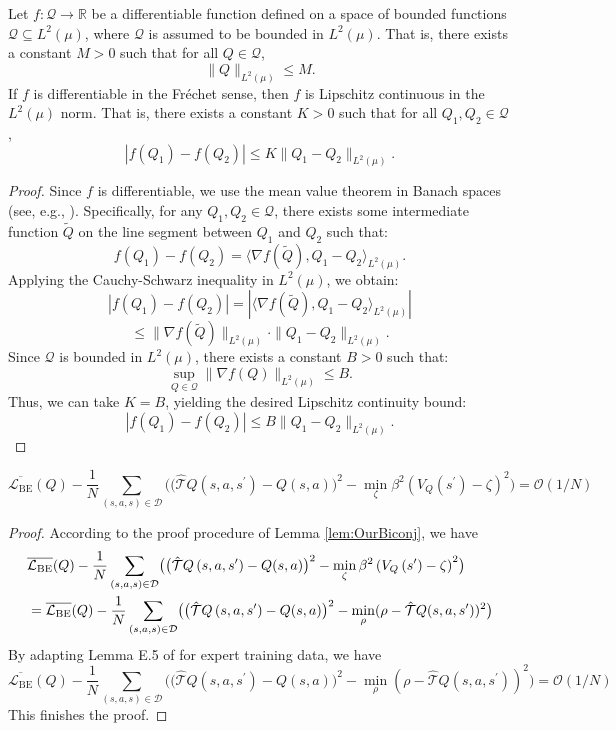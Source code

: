 \begin{lem}
\label{lem:JointLipschitz}
  Let $f: \mathcal{Q} \to \mathbb{R}$ be a differentiable function defined on a space of bounded functions $\mathcal{Q} \subseteq L^2(\mu)$, where $\mathcal{Q}$ is assumed to be bounded in $L^2(\mu)$. That is, there exists a constant $M > 0$ such that for all $Q \in \mathcal{Q}$,
$$
\| Q \|_{L^2(\mu)} \leq M.
$$
If $f$ is differentiable in the Fréchet sense, then $f$ is Lipschitz continuous in the $L^2(\mu)$ norm. That is, there exists a constant $K > 0$ such that for all $Q_1, Q_2 \in \mathcal{Q}$,
$$
|f(Q_1) - f(Q_2)| \leq K \|Q_1 - Q_2\|_{L^2(\mu)}.
$$
\end{lem}

\begin{proof}
    Since $f$ is differentiable, we use the mean value theorem in Banach spaces (see, e.g., \citet{yosida2012functional}). Specifically, for any $Q_1, Q_2 \in \mathcal{Q}$, there exists some intermediate function $\tilde{Q}$ on the line segment between $Q_1$ and $Q_2$ such that:
$$
f(Q_1) - f(Q_2) = \langle \nabla f(\tilde{Q}), Q_1 - Q_2 \rangle_{L^2(\mu)}.
$$
Applying the Cauchy-Schwarz inequality in $L^2(\mu)$, we obtain:
$$
|f(Q_1) - f(Q_2)| = |\langle 
\nabla f(\tilde{Q}), Q_1 - Q_2 \rangle_{L^2(\mu)}|
$$
$$
\leq \|\nabla f(\tilde{Q})\|_{L^2(\mu)} \cdot \|Q_1 - Q_2\|_{L^2(\mu)}.
$$
Since $\mathcal{Q}$ is bounded in $L^2(\mu)$, there exists a constant $B > 0$ such that:
$$
\sup_{Q \in \mathcal{Q}} \|\nabla f(Q)\|_{L^2(\mu)} \leq B.
$$
Thus, we can take $K = B$, yielding the desired Lipschitz continuity bound:
$$
|f(Q_1) - f(Q_2)| \leq B \|Q_1 - Q_2\|_{L^2(\mu)}.
$$
\end{proof}

\iffalse


\begin{lem}
$$
\overline{\mathcal{L}_{\mathrm{BE}}}(Q)-\frac{1}{N}\sum_{(s,a,s)\in \mathcal{D}} \bigl(\bigl(\hat{\mathcal{T}} Q\left(s, a, s^{\prime}\right)-Q(s, a)\bigr)^2 -\min_\zeta\beta^2  \left(V_{Q}\left(s^{\prime}\right)-\zeta\right)^2\bigr)=\mathcal{O}(1/N) $$
\end{lem}
\begin{proof}
According to the proof procedure of Lemma \ref{lem:OurBiconj}, we have
    \begin{align}
    &\overline{\mathcal{L}_{\mathrm{BE}}}(Q)-\frac{1}{N}\sum_{(s,a,s)\in \mathcal{D}} \bigl(\bigl(\hat{\mathcal{T}} Q\left(s, a, s^{\prime}\right)-Q(s, a)\bigr)^2 -\min_\zeta\beta^2  \left(V_{Q}\left(s^{\prime}\right)-\zeta\right)^2\bigr)\notag
    \\
    &=\overline{\mathcal{L}_{\mathrm{BE}}}(Q)-\frac{1}{N}\sum_{(s,a,s)\in \mathcal{D}} \bigl(\bigl(\hat{\mathcal{T}} Q\left(s, a, s^{\prime}\right)-Q(s, a)\bigr)^2 -\min_\rho
    (\rho - \hat{\mathcal{T}}Q(s, a, s^\prime))^2\bigr)\notag
    \end{align}
    By adapting Lemma E.5 of \citet{touati2020sharp} for expert training data, we have $$\overline{\mathcal{L}_{\mathrm{BE}}}(Q)-\frac{1}{N}\sum_{(s,a,s)\in \mathcal{D}} \bigl(\bigl(\hat{\mathcal{T}} Q\left(s, a, s^{\prime}\right)-Q(s, a)\bigr)^2 -\min_\rho
    (\rho - \hat{\mathcal{T}}Q(s, a, s^\prime))^2\bigr)=\mathcal{O}(1/N)$$This finishes the proof.
\end{proof}


